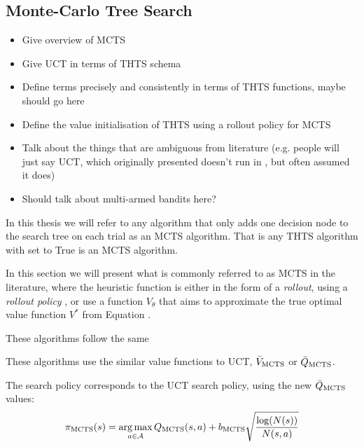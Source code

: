     
    \subsection{Monte-Carlo Tree Search}
    \label{sec:2-2-3-mcts}

        \begin{itemize}
            \item Give overview of MCTS
            \item Give UCT in terms of THTS schema 
            \item Define terms precisely and consistently in terms of THTS functions, maybe \mctsmode\ewe should go here
            \item Define the value initialisation of THTS using a rollout policy for MCTS
            \item Talk about the things that are ambiguous from literature (e.g. people will just say UCT, which originally presented doesn't run in \mctsmode, but often assumed it does)
            \item Should talk about multi-armed bandits here?
        \end{itemize}




        In this thesis we will refer to any algorithm that only adds one decision node to the search tree on each trial as an MCTS algorithm. That is any THTS algorithm with \mctsmode set to True is an MCTS algorithm. 

        In this section we will present what is commonly referred to as MCTS in the literature, where the heuristic function is either in the form of a \textit{rollout}, using a \textit{rollout policy} , or use a function $V_\theta$ that aims to approximate the true optimal value function $V^*$ from Equation  .

        These algorithms follow the same 

        These algorithms use the similar value functions to UCT, $\bar{V}_{\textnormal{MCTS}}$ or $\bar{Q}_{\textnormal{MCTS}}$. 

        The search policy corresponds to the UCT search policy, using the new $\bar{Q}_{\textnormal{MCTS}}$ values:
        \begin{align}
            \pi_{\textnormal{MCTS}}(s) = \operatorname*{arg\,max}_{a\in\mathcal{A}} Q_{\textnormal{MCTS}}(s,a) + b_{\textnormal{MCTS}} \sqrt{\frac{\log(N(s))}{N(s,a)}} 
        \end{align}

